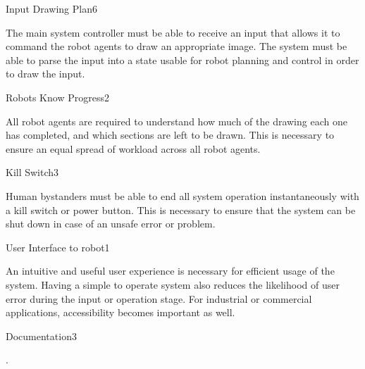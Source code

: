 \begin{functional_requirement}{Input Drawing Plan}{6}
\label{fr:input_plan}
\item The main system controller must be able to receive an input that allows it to command the robot agents to draw an appropriate image. The system must be able to parse the input into a state usable for robot planning and control in order to draw the input. 
\end{functional_requirement}

\begin{functional_requirement}{Robots Know Progress}{2}
\label{fr:know_progress}
\item All robot agents are required to understand how much of the drawing each one has completed, and which sections are left to be drawn. This is necessary to ensure an equal spread of workload across all robot agents. 
\end{functional_requirement}

\begin{functional_requirement}{Kill Switch}{3}
\label{fr:kill_switch}
\item Human bystanders must be able to end all system operation instantaneously with a kill switch or power button. This is necessary to ensure that the system can be shut down in case of an unsafe error or problem. 
\end{functional_requirement}

\begin{functional_requirement}{User Interface to robot}{1}
\label{fr:user_interface}
\item An intuitive and useful user experience is necessary for efficient usage of the system. Having a simple to operate system also reduces the likelihood of user error during the input or operation stage. For industrial or commercial applications, accessibility becomes important as well. 
\end{functional_requirement}

\begin{functional_requirement}{Documentation}{3}
\item .
\end{functional_requirement}


